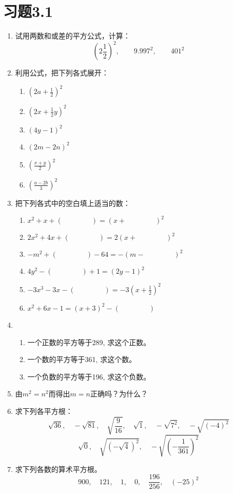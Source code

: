 \section*{习题3.1}
\begin{enumerate}
    \item 试用两数和或差的平方公式，计算：
\[\left(2\frac{1}{2}\right)^2,\qquad 9.997^2,\qquad 401^2\]
    \item 利用公式，把下列各式展开：
\begin{multicols}{2}
\begin{enumerate}
    \item $\left(2a+\frac{1}{2}\right)^2$
    \item $\left(2x+\frac{1}{2}y\right)^2$
    \item $(4y-1)^2$
    \item $(2m-2n)^2$
    \item $\left(\frac{x+y}{2}\right)^2$
    \item $\left(\frac{a-2b}{3}\right)^2$
\end{enumerate}
\end{multicols}
    \item 把下列各式中的空白填上适当的数：
\begin{enumerate}
    \item $x^2+x+(\qquad\qquad  )=(x+\qquad\qquad  )^2$
    \item $2x^2+4x+(\qquad\qquad   )=2(x+\qquad\qquad  )^2$
    \item $-m^2+(\qquad\qquad   )-64=-(m-\qquad\qquad  )^2$
    \item $4y^2-(\qquad\qquad  )+1=(2y-1)^2$
    \item $-3x^3-3x-(\qquad\qquad  )=-3\left(x+\frac{1}{2}\right)^2$
    \item $x^2+6x-1=(x+3)^2-(\qquad\qquad   )$
\end{enumerate}
    \item \begin{enumerate}
        \item 一个正数的平方等于289, 求这个正数。
        \item 一个数的平方等于361, 求这个数。
        \item 一个负数的平方等于196, 求这个负数。
    \end{enumerate}
    
\item 由$m^2=n^2$而得出$m=n$正确吗？为什么？
\item 求下列各平方根：
\[\sqrt{36},\quad -\sqrt{81},\quad \sqrt{\frac{9}{16}},\quad \sqrt{1},\quad -\sqrt{7^2},\quad -\sqrt{(-4)^2}\]
\[\sqrt{0},\quad \sqrt{(-\sqrt{4})^2},\quad -\sqrt{\left(-\frac{1}{361}\right)^2}\]
\item 求下列各数的算术平方根。
\[900,\quad 121,\quad 1,\quad 0,\quad \frac{196}{256},\quad (-25)^2\]


\end{enumerate}
